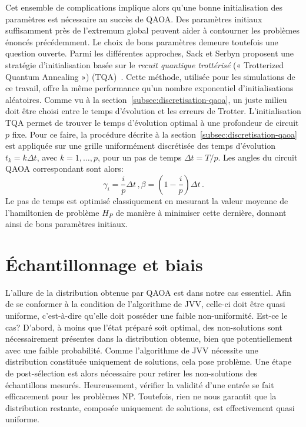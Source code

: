 Cet ensemble de complications implique alors qu'une bonne initialisation des paramètres est nécessaire au succès de QAOA. Des paramètres initiaux suffisamment près de l'extremum global peuvent aider à contourner les problèmes énoncés précédemment. Le choix de bons paramètres demeure toutefois une question ouverte. Parmi les différentes approches, Sack et Serbyn proposent une stratégie d'initialisation basée sur le \textit{recuit quantique trottérisé} (« Trotterized Quantum Annealing ») (TQA)~\cite{sackQuantumAnnealingInitialization2021}. Cette méthode, utilisée pour les simulations de ce travail, offre la même performance qu'un nombre exponentiel d'initialisations aléatoires. Comme vu à la section~\ref{subsec:discretisation-qaoa}, un juste milieu doit être choisi entre le temps d'évolution et les erreurs de Trotter. L'initialisation TQA permet de trouver le temps d'évolution optimal à une profondeur de circuit $p$ fixe. Pour ce faire, la procédure décrite à la section~\ref{subsec:discretisation-qaoa} est appliquée sur une grille uniformément discrétisée des temps d'évolution $t_{k} = k \Delta t$, avec $k = 1,\dots, p$, pour un pas de temps $\Delta t = T / p$. Les angles du circuit QAOA correspondant sont alors:
\begin{equation}
    \gamma_{i} = \frac{i}{p} \Delta t \,, \beta = (1 - \frac{i}{p}) \Delta t \,.
\end{equation}
Le pas de temps est optimisé classiquement en mesurant la valeur moyenne de l'hamiltonien de problème $H_{P}$ de manière à minimiser cette dernière, donnant ainsi de bons paramètres initiaux.


\section{Échantillonnage et biais}
\label{sec:echantillonnage-et-biais}

L'allure de la distribution obtenue par QAOA est dans notre cas essentiel. Afin de se conformer à la condition de l'algorithme de JVV, celle-ci doit être quasi uniforme, c'est-à-dire qu'elle doit posséder une faible non-uniformité. Est-ce le cas? D'abord, à moins que l'état préparé soit optimal, des non-solutions sont nécessairement présentes dans la distribution obtenue, bien que potentiellement avec une faible probabilité. Comme l'algorithme de JVV nécessite une distribution constituée uniquement de solutions, cela pose problème. Une étape de post-sélection est alors nécessaire pour retirer les non-solutions des échantillons mesurés. Heureusement, vérifier la validité d'une entrée se fait efficacement pour les problèmes \textsf{NP}. Toutefois, rien ne nous garantit que la distribution restante, composée uniquement de solutions, est effectivement quasi uniforme.

